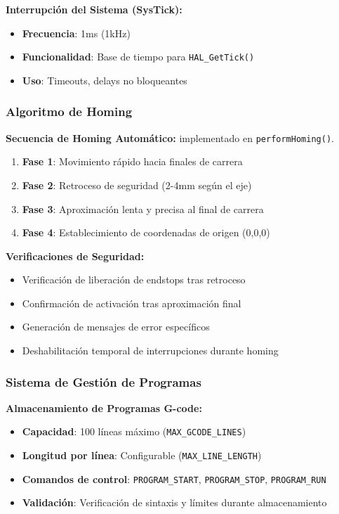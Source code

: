 \documentclass[12pt]{article}
\begin{document}
\textbf{Interrupción del Sistema (SysTick):}
\begin{itemize}
    \item \textbf{Frecuencia}: 1ms (1kHz)
    \item \textbf{Funcionalidad}: Base de tiempo para \texttt{HAL\_GetTick()}
    \item \textbf{Uso}: Timeouts, delays no bloqueantes
\end{itemize}

\subsubsection{Algoritmo de Homing}

\textbf{Secuencia de Homing Automático:} implementado en \texttt{performHoming()}.

\begin{enumerate}
    \item \textbf{Fase 1}: Movimiento rápido hacia finales de carrera
    \item \textbf{Fase 2}: Retroceso de seguridad (2-4mm según el eje)
    \item \textbf{Fase 3}: Aproximación lenta y precisa al final de carrera
    \item \textbf{Fase 4}: Establecimiento de coordenadas de origen (0,0,0)
\end{enumerate}

\textbf{Verificaciones de Seguridad:}
\begin{itemize}
    \item Verificación de liberación de endstops tras retroceso
    \item Confirmación de activación tras aproximación final
    \item Generación de mensajes de error específicos
    \item Deshabilitación temporal de interrupciones durante homing
\end{itemize}

\subsubsection{Sistema de Gestión de Programas}

\textbf{Almacenamiento de Programas G-code:}
\begin{itemize}
    \item \textbf{Capacidad}: 100 líneas máximo (\texttt{MAX\_GCODE\_LINES})
    \item \textbf{Longitud por línea}: Configurable (\texttt{MAX\_LINE\_LENGTH})
    \item \textbf{Comandos de control}: \texttt{PROGRAM\_START}, \texttt{PROGRAM\_STOP}, \texttt{PROGRAM\_RUN}
    \item \textbf{Validación}: Verificación de sintaxis y límites durante almacenamiento
\end{itemize}
\end{document}
